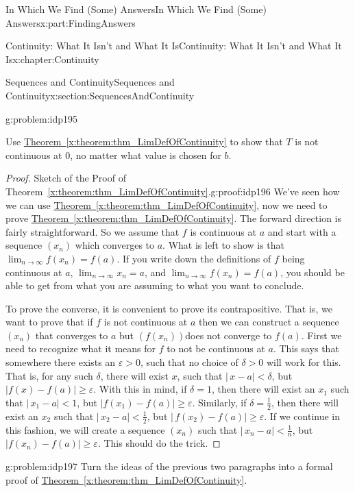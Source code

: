 \documentclass[oneside,10pt,]{book}
\newcommand{\xreffont}{\relax}
\numberwithin{equation}{section}
\def\limit#1#2#3{{\displaystyle\lim_{#1\rightarrow #2}#3}}
\newcommand{\eps}{\varepsilon}
\newcommand{\lt}{<}
\begin{document}
\begin{partptx}{In Which We Find (Some) Answers}{}{In Which We Find (Some) Answers}{}{}{x:part:FindingAnswers}
\begin{chapterptx}{Continuity: What It Isn't and What It Is}{}{Continuity: What It Isn't and What It Is}{}{}{x:chapter:Continuity}
\begin{sectionptx}{Sequences and Continuity}{}{Sequences and Continuity}{}{}{x:section:SequencesAndContinuity}
\begin{problem}{}{g:problem:idp195}
%
\par
Use \hyperref[x:theorem:thm_LimDefOfContinuity]{Theorem~{\xreffont\ref{x:theorem:thm_LimDefOfContinuity}}} to show that \(T\) is not continuous at \(0\), no matter what value is chosen for \(b\).%
\end{problem}
\begin{proof}{Sketch of the Proof of Theorem~{\xreffont\ref*{x:theorem:thm_LimDefOfContinuity}}.}{g:proof:idp196}
We've seen how we can use \hyperref[x:theorem:thm_LimDefOfContinuity]{Theorem~{\xreffont\ref{x:theorem:thm_LimDefOfContinuity}}}, now we need to prove \hyperref[x:theorem:thm_LimDefOfContinuity]{Theorem~{\xreffont\ref{x:theorem:thm_LimDefOfContinuity}}}.  The forward direction is fairly straightforward.  So we assume that \(f\) is continuous at \(a\) and start with a sequence \(\left(x_n\right)\) which converges to \(a\). What is left to show is that \(\lim_{n\rightarrow\infty}f(x_n)=f(a)\).  If you write down the definitions of \(f\) being continuous at \(a\), \(\lim_{n\rightarrow\infty}x_n=a\), and \(\lim_{n\rightarrow\infty}f(x_n)=f(a)\), you should be able to get from what you are assuming to what you want to conclude.%
\par
To prove the converse, it is convenient to prove its contrapositive.  That is, we want to prove that if \(f\) is not continuous at \(a\) then we can construct a sequence \(\left(x_n\right)\) that converges to \(a\) but \(\left(f(x_n)\right)\)does not converge to \(f(a)\). First we need to recognize what it means for \(f\) to not be continuous at \(a\).  This says that somewhere there exists an \(\eps>0\), such that no choice of \(\delta>0\) will work for this.  That is, for any such \(\delta\), there will exist \(x\), such that \(|\,x-a|\lt \delta\), but \(|f(x)-f(a)|\geq\eps\). With this in mind, if \(\delta=1\), then there will exist an \(x_1\) such that \(|\,x_1-a|\lt 1\), but \(|f(x_1)-f(a)|\geq\eps\).  Similarly, if \(\delta=\frac{1}{2}\), then there will exist an \(x_2\) such that \(|\,x_2-a|\lt \frac{1}{2}\), but \(|\,f(x_2)-f(a)|\geq\eps\).  If we continue in this fashion, we will create a sequence \(\left(x_n\right)\) such that \(|\,x_n-a|\lt \frac{1}{n}\), but \(|f(x_n)-f(a)|\geq\eps\).  This should do the trick.%
\end{proof}
\begin{problem}{}{g:problem:idp197}%
\index{limit!\(\limit{x}{a}{f(x)}=f(a)\) implies \(f(x)\) is continuous} Turn the ideas of the previous two paragraphs into a formal proof of \hyperref[x:theorem:thm_LimDefOfContinuity]{Theorem~{\xreffont\ref{x:theorem:thm_LimDefOfContinuity}}}.%

\end{problem}
\end{sectionptx}
\end{chapterptx}
\end{partptx}
\end{document}
